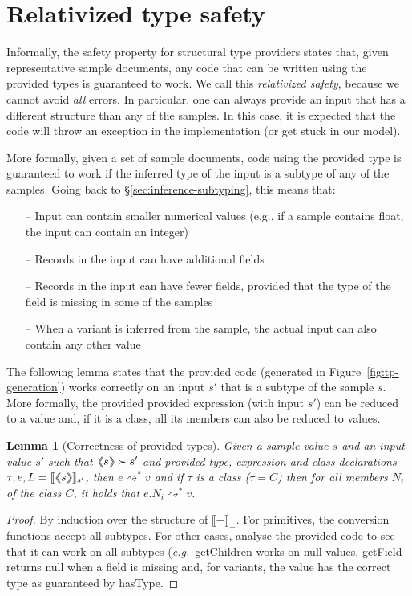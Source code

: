 \documentclass[10pt,preprint,blind,clearpagebib]{sigplanconf}
\newcommand{\langl}{\begin{picture}(4.5,7)
\put(1.1,2.5){\rotatebox{60}{\line(1,0){5.5}}}
\put(1.1,2.5){\rotatebox{300}{\line(1,0){5.5}}}
\end{picture}}
\newcommand{\rangl}{\begin{picture}(4.5,7)
\put(.9,2.5){\rotatebox{120}{\line(1,0){5.5}}}
\put(.9,2.5){\rotatebox{240}{\line(1,0){5.5}}}
\end{picture}}
\newcommand{\llangl}{\langl\hspace{-0.35em}\langl}
\newcommand{\rrangl}{\rangl\hspace{-0.35em}\rangl}
\newcommand{\kvd}[1]{\textnormal{\textcolor{kvdclr}{\sffamily #1}}}
\newcommand{\ident}[1]{\textnormal{\sffamily #1}}
\newcommand{\reduce}{\rightsquigarrow}
\newcommand{\sem}[1]{\llbracket #1 \rrbracket}
\newcommand{\semalt}[1]{\llangl #1 \rrangl}
\newtheorem{lemma}[theorem]{Lemma}
\begin{document}
\section{Relativized type safety}
\label{sec:safety}

Informally, the safety property for structural type providers states that, given representative sample
documents, any code that can be written using the provided types is guaranteed to work. We call this 
\emph{relativized safety}, because we cannot avoid \emph{all} errors. In particular, one can always
provide an input that has a different structure than any of the samples. In this case, it is expected 
that the code will throw an exception in the implementation (or get stuck in our model).

More formally, given a set of sample documents, code using the provided type is guaranteed to work if 
the inferred type of the input is a subtype of any of the samples. Going back to 
\S\ref{sec:inference-subtyping}, this means that:
%
\begin{itemize}[noitemsep]
\item[--] Input can contain smaller numerical values (e.g., if a sample contains float, the input can contain an integer)
\item[--] Records in the input can have additional fields
\item[--] Records in the input can have fewer fields, provided that the type of the field is missing in some of the samples
\item[--] When a variant is inferred from the sample, the actual input can also contain any other value  
\end{itemize}
%
The following lemma states that the provided code (generated in Figure~\ref{fig:tp-generation})
works correctly on an input $s'$ that is a subtype of the sample $s$. More formally, the provided
provided expression (with input $s'$) can be reduced to a value and, if it is a class,
all its members can also be reduced to values.

\begin{lemma}[Correctness of provided types]
\label{thm:tp-correctness}
Given a sample value $s$ and an input value $s'$ such that $\semalt{s} \succ s'$
and provided type, expression and class declarations $\tau, e, L = \sem{\semalt{s}}_{s'}$, 
then $e \reduce^{*} v$ and if $\tau$ is a class ($\tau=C$) then for all members $N_i$ of the 
class $C$, it holds that $e.N_i \reduce^{*} v$.
\end{lemma}
\begin{proof}
By induction over the structure of $\sem{-}_-$. For primitives, the conversion functions accept all subtypes.
For other cases, analyse the provided code to see that it can work on all subtypes (\emph{e.g.}~\ident{getChildren}
works on \kvd{null} values, \ident{getField} returns \kvd{null} when a field is missing and, for variants,
the value has the correct type as guaranteed by \ident{hasType}.
\end{proof}
\end{document}
